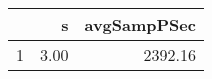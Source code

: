 \begin{table}[h]
\centering
\begin{tabular}{rrr}
  \hline
 & s & avgSampPSec \\ 
  \hline
1 & 3.00 & 2392.16 \\ 
   \hline
\end{tabular}
\end{table}
